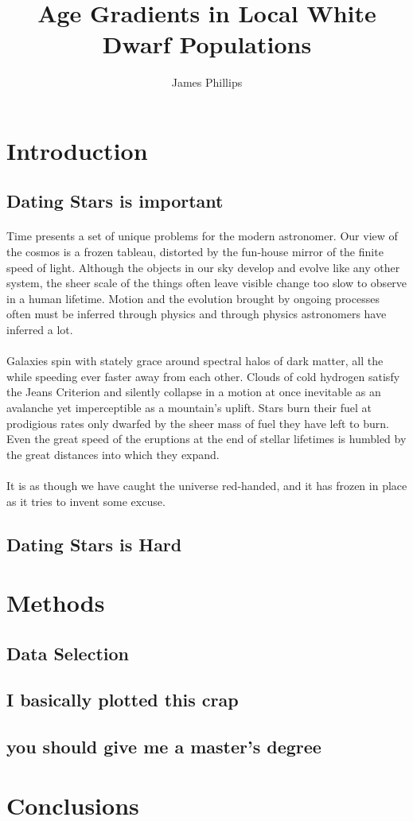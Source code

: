 \documentclass[11pt,letterpaper,draft,titlepage]{article}
\author{James Phillips}
\title{Age Gradients in Local White Dwarf Populations}
\begin{document}
	\pagestyle{empty}

	\tableofcontents
	\newpage
	
	\pagestyle{plain}
	\section{Introduction}
		\subsection{Dating Stars is important}
		\paragraph{}
		Time presents a set of unique problems for the modern astronomer. Our view of the cosmos is a frozen tableau, distorted by the fun-house mirror of the finite speed of light. Although the objects in our sky develop and evolve like any other system, the sheer scale of the things often leave visible change too slow to observe in a human lifetime. Motion and the evolution brought by ongoing processes often must be inferred through physics and through physics astronomers have inferred a lot. 
		\paragraph{}
		Galaxies spin with stately grace around spectral halos of dark matter, all the while speeding ever faster away from each other. Clouds of cold hydrogen satisfy the Jeans Criterion and silently collapse in a motion at once inevitable as an avalanche yet imperceptible as a mountain's uplift. Stars burn their fuel at prodigious rates only dwarfed by the sheer mass of fuel they have left to burn. Even the great speed of the eruptions at the end of stellar lifetimes is humbled by the great distances into which they expand.
		\paragraph{}
		It is as though we have caught the universe red-handed, and it has frozen in place as it tries to invent some excuse. 
		
		\subsection{Dating Stars is Hard}
		
	\section{Methods}
		\subsection{Data Selection}
		\subsection{I basically plotted this crap}
		\subsection{you should give me a master's degree}
	
	\section{Conclusions}
	
	
	
\end{document}
